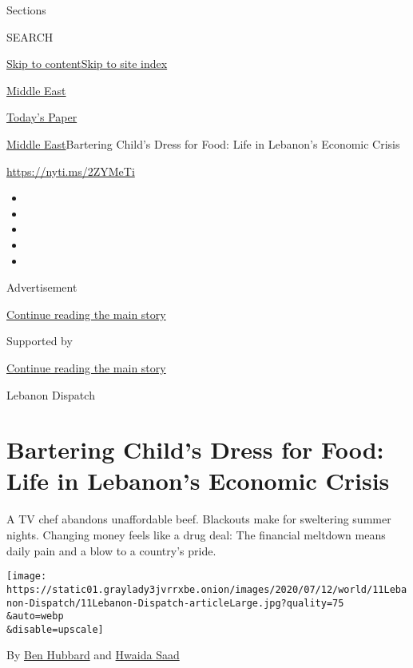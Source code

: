 Sections

SEARCH

\protect\hyperlink{site-content}{Skip to
content}\protect\hyperlink{site-index}{Skip to site index}

\href{https://www.nytimes3xbfgragh.onion/section/world/middleeast}{Middle
East}

\href{https://myaccount.nytimes3xbfgragh.onion/auth/login?response_type=cookie\&client_id=vi}{}

\href{https://www.nytimes3xbfgragh.onion/section/todayspaper}{Today's
Paper}

\href{/section/world/middleeast}{Middle East}\textbar{}Bartering Child's
Dress for Food: Life in Lebanon's Economic Crisis

\url{https://nyti.ms/2ZYMeTi}

\begin{itemize}
\item
\item
\item
\item
\item
\end{itemize}

Advertisement

\protect\hyperlink{after-top}{Continue reading the main story}

Supported by

\protect\hyperlink{after-sponsor}{Continue reading the main story}

Lebanon Dispatch

\hypertarget{bartering-childs-dress-for-food-life-in-lebanons-economic-crisis}{%
\section{Bartering Child's Dress for Food: Life in Lebanon's Economic
Crisis}\label{bartering-childs-dress-for-food-life-in-lebanons-economic-crisis}}

A TV chef abandons unaffordable beef. Blackouts make for sweltering
summer nights. Changing money feels like a drug deal: The financial
meltdown means daily pain and a blow to a country's pride.

\texttt{[image: https://static01.graylady3jvrrxbe.onion/images/2020/07/12/world/11Lebanon-Dispatch/11Lebanon-Dispatch-articleLarge.jpg?quality=75\\\&auto=webp\\\&disable=upscale]}

By \href{https://www.nytimes3xbfgragh.onion/by/ben-hubbard}{Ben Hubbard}
and \href{https://www.nytimes3xbfgragh.onion/by/hwaida-saad}{Hwaida
Saad}

